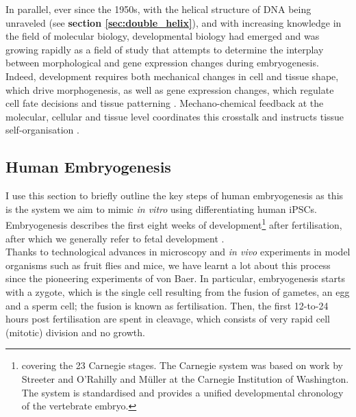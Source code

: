 In parallel, ever since the 1950s, with the helical structure of DNA being unraveled (see \textbf{section \ref{sec:double_helix}}), and with increasing knowledge in the field of molecular biology, developmental biology had emerged and was growing rapidly as a field of study
that attempts to determine the interplay between morphological and gene expression changes during embryogenesis.
Indeed, development requires both mechanical changes in cell and tissue shape, which drive morphogenesis, as well as gene expression changes, which regulate cell fate decisions and tissue patterning \cite{niakan2013analysis, petropoulos2016single}. 
Mechano-chemical feedback at the molecular, cellular and tissue level coordinates this crosstalk and instructs tissue self-organisation \cite{hannezo2019mechanochemical}.

\newpage

\subsection{Human Embryogenesis}
\label{sec:human_embryogenesis}


I use this section to briefly outline the key steps of human embryogenesis as this is the system we aim to mimic \textit{in vitro} using differentiating human iPSCs.
Embryogenesis describes the first eight weeks of development\footnote{covering the 23 Carnegie stages.
The Carnegie system was based on work by Streeter \cite{streeter1942developmental} and O'Rahilly and Müller \cite{o1973developmental, o2010developmental} at the Carnegie Institution of Washington.
The system is standardised and provides a unified developmental chronology of the vertebrate embryo.} after fertilisation, after which we generally refer to fetal development \cite{gilbert2008developmental}.\\

Thanks to technological advances in microscopy and \textit{in vivo} experiments in model organisms such as fruit flies and mice, we have learnt a lot about this process since the pioneering experiments of von Baer.
In particular, embryogenesis starts with a zygote, which is the single cell resulting from the fusion of gametes, an egg and a sperm cell; the fusion is known as fertilisation.
Then, the first 12-to-24 hours post fertilisation are spent in cleavage, which consists of very rapid cell (mitotic) division and no growth.\\

